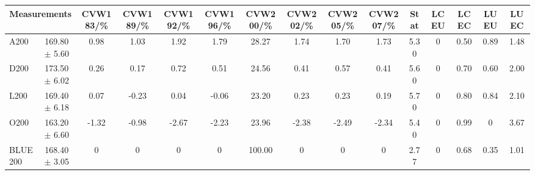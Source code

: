 \begin{table}[H]
\scriptsize
\begin{center}
\renewcommand{\arraystretch}{1.1}
\begin{tabular}{|lc|c|c|c|c|c|c|c|c|ccccc|}
\hline
\multicolumn{2}{|c|}{Measurements} & CVW{\tiny 183}/\%  & CVW{\tiny 189}/\%  & CVW{\tiny 192}/\%  & CVW{\tiny 196}/\%  & CVW{\tiny 200}/\%  & CVW{\tiny 202}/\%  & CVW{\tiny 205}/\%  & CVW{\tiny 207}/\%  & {\tiny Stat} & {\tiny LCEU} & {\tiny LCEC} & {\tiny LUEU} & {\tiny LUEC}\\
\hline
A200 &     169.80 $\pm$       5.60 &       0.98 &       1.03 &       1.92 &       1.79 &      28.27 &       1.74 &       1.70 &       1.73 &       5.30 &  0 &       0.50 &       0.89 &       1.48\\
D200 &     173.50 $\pm$       6.02 &       0.26 &       0.17 &       0.72 &       0.51 &      24.56 &       0.41 &       0.57 &       0.41 &       5.60 &  0 &       0.70 &       0.60 &       2.00\\
L200 &     169.40 $\pm$       6.18 &       0.07 &      -0.23 &       0.04 &      -0.06 &      23.20 &       0.23 &       0.23 &       0.19 &       5.70 &  0 &       0.80 &       0.84 &       2.10\\
O200 &     163.20 $\pm$       6.60 &      -1.32 &      -0.98 &      -2.67 &      -2.23 &      23.96 &      -2.38 &      -2.49 &      -2.34 &       5.40 &  0 &       0.99 &  0 &       3.67\\
\hline
BLUE {\tiny 200} &     168.40 $\pm$       3.05 &  0 &  0 &  0 &  0 &     100.00 &  0 &  0 &  0 &       2.77 &  0 &       0.68 &       0.35 &       1.01\\
\hline
\end{tabular}
\renewcommand{\arraystretch}{1}
\end{center}
\end{table}
\vspace*{-0.5cm}
